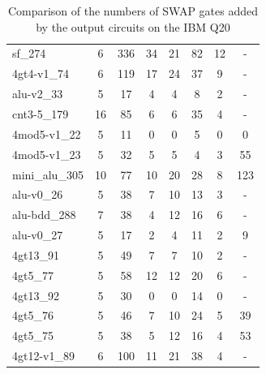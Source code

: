 \documentclass[runningheads]{llncs}
\begin{document}
\begin{table}[!ht]
\begin{center}
\begin{tabular}{|p{4.3cm}<{\centering}|c|c|c|c|c|c|c|}
sf\_274 & 6 & 336 & 34 & 21 & 82 & 12& - \\
4gt4-v1\_74 & 6 & 119 & 17 & 24 & 37 & 9& - \\
alu-v2\_33 & 5 & 17 & 4 & 4 & 8 & 2& - \\
cnt3-5\_179 & 16 & 85 & 6 & 6 & 35 & 4& - \\
4mod5-v1\_22 & 5 & 11 & 0 & 0 & 5 & 0&0 \\
4mod5-v1\_23 & 5 & 32 & 5 & 5 & 4 & 3& 55\\
mini\_alu\_305 & 10 & 77 & 10 & 20 & 28 & 8& 123 \\
alu-v0\_26 & 5 & 38 & 7 & 10 & 13 & 3& - \\
alu-bdd\_288 & 7 & 38 & 4 & 12 & 16 & 6& - \\
alu-v0\_27 & 5 & 17 & 2 & 4 & 11 & 2& 9 \\
4gt13\_91 & 5 & 49 & 7 & 7 & 10 & 2& - \\
4gt5\_77 & 5 & 58 & 12 & 12 & 20 & 6& - \\
4gt13\_92 & 5 & 30 & 0 & 0 & 14 & 0& - \\
			4gt5\_76 & 5 & 46 & 7 & 10 & 24 & 5&39 \\
			4gt5\_75 & 5 & 38 & 5 & 12 & 16 & 4& 53 \\
			4gt12-v1\_89 & 6 & 100 & 11 & 21 & 38 & 4& - \\
		\hline
		\end{tabular} 
		\end{center} 
		\caption{Comparison of the numbers of SWAP gates added by the 
		output circuits on the IBM Q20 } 
		\label{tab3}
		\end{table}	
		
\end{document}
